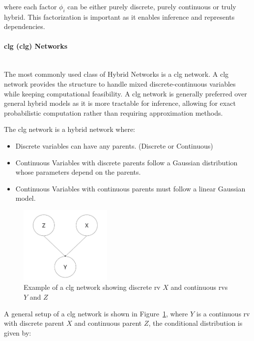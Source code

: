 \documentclass[12pt,a4paper]{article}
\begin{document}
where each factor $\phi_i$ can be either purely discrete, purely continuous or truly hybrid. This factorization is important as it enables inference and represents dependencies.

\paragraph{\acl{clg} (\acs{clg}) Networks}
\mbox{}\\
The most commonly used class of Hybrid Networks is a \acs{clg} network. A \acs{clg} network provides the structure to handle mixed discrete-continuous variables while keeping computational feasibility. A \acs{clg} network is generally preferred over general hybrid models as it is more tractable for inference, allowing for exact probabilistic computation rather than requiring approximation methods.

The \acs{clg} network is a hybrid network where:

\begin{itemize}
	\item Discrete variables can have any parents. (Discrete or Continuous)
	\item Continuous Variables with discrete parents follow a Gaussian distribution whose parameters depend on the parents.
	\item Continuous Variables with continuous parents must follow a linear Gaussian model.
\end{itemize}

\begin{figure}[H]
	\centering
	\includegraphics[width=0.4\textwidth]{hybridNet.jpg}
	\caption{Example of a \acl{clg} network showing discrete \acs{rv} $X$ and continuous \acs{rv}s $Y$ and $Z$}
	\label{fig:clg_network}
\end{figure}

A general setup of a \acs{clg} network is shown in Figure~\ref{fig:clg_network}, where $Y$ is a continuous \acs{rv} with discrete parent $X$ and continuous parent $Z$, the conditional distribution is given by:
\end{document}

